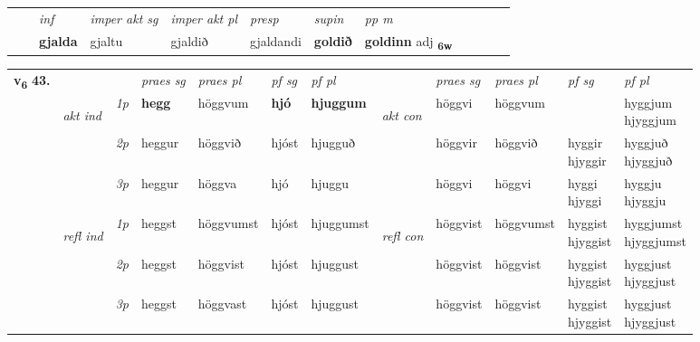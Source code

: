 \begin{tabular}{llllllllllll}
 & & \textit{inf} & \textit{imper akt sg} & \textit{imper akt pl}   & \textit{presp} & \textit{supin}  & \textit{pp m}     \\*
  & & \textbf{gjalda} & gjaltu  & gjaldið   & gjaldandi &  \textbf{goldið}  & \textbf{goldinn} adj \textbf{\textsubscript{6w}} \\*
\cmidrule{1-12}
\end{tabular}



\begin{tabular}{llllllllllll} \toprule
\multirow{4}{*}{{{\textbf{v{\textsubscript{6}}} \Large{\textbf{43.}}}}}  & &   &  \textit{praes sg}  & \textit{praes pl}  &\textit{ pf sg} & \textit{pf pl} &  &  \textit{praes sg}  & \textit{praes pl}  & \textit{pf sg} & \textit{pf pl } \\*
	\cmidrule{4-7} \cmidrule{9-12}
 & \multirow{3}{*}{\begin{turn}{90}\textit{akt ind}\end{turn}} & {\textit{1p}} & \textbf{hegg} & höggvum    & \textbf{hjó} & \textbf{hjuggum} & \multirow{3}{*}{\begin{turn}{90}\textit{akt con}\end{turn}} &höggvi & höggvum & \textbf{\specialcell{hyggi\\ hjyggi}} & \specialcell{hyggjum\\ hjyggjum}\\*
& &  {\textit{2p}} &  heggur  & höggvið   & hjóst & hjugguð & & höggvir & höggvið & \specialcell{hyggir\\ hjyggir} & \specialcell{hyggjuð\\ hjyggjuð} \\*
& &  {\textit{3p}} & heggur & höggva   & hjó & hjuggu & & höggvi & höggvi& \specialcell{hyggi\\ hjyggi} & \specialcell{hyggju\\ hjyggju}  \\*
\cmidrule{4-7} \cmidrule{9-12}
 &\multirow{3}{*}{\begin{turn}{90}\textit{refl ind}\end{turn}} & {\textit{1p}} & heggst & höggvumst    & hjóst & hjuggumst & \multirow{3}{*}{\begin{turn}{90}\textit{refl con}\end{turn}}  &höggvist & höggvumst & \specialcell{hyggist\\ hjyggist} & \specialcell{hyggjumst\\ hjyggjumst}\\*
 &&  {\textit{2p}} &  heggst  & höggvist   & hjóst & hjuggust & &höggvist & höggvist & \specialcell{hyggist\\ hjyggist} & \specialcell{hyggjust\\ hjyggjust} \\*
& &  {\textit{3p}} & heggst & höggvast   & hjóst & hjuggust & & höggvist & höggvist& \specialcell{hyggist\\ hjyggist} & \specialcell{hyggjust\\ hjyggjust}  \\*
\cmidrule{4-7} \cmidrule{9-12}
\end{tabular}


